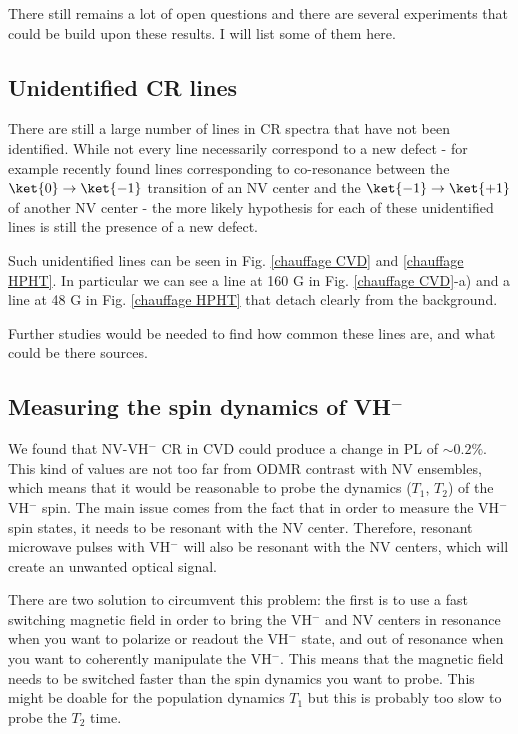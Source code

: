 \documentclass[a4paper,11pt]{report}
\begin{document}
\begin{refsection}
There still remains a lot of open questions and there are several experiments that could be build upon these results. I will list some of them here.

\subsection{Unidentified CR lines}

There are still a large number of lines in CR spectra that have not been identified. While not every line necessarily correspond to a new defect - for example \citep{wunderlich2021magnetic} recently found lines corresponding to co-resonance between the $\ket{0} \to \ket{-1}$ transition of an NV center and the $\ket{-1} \to \ket{+1}$ of another NV center - the more likely hypothesis for each of these unidentified lines is still the presence of a new defect.

Such unidentified lines can be seen in Fig. \ref{chauffage CVD} and \ref{chauffage HPHT}. In particular we can see a line at 160 G in Fig. \ref{chauffage CVD}-a) and a line at 48 G in Fig. \ref{chauffage HPHT} that detach clearly from the background. 

Further studies would be needed to find how common these lines are, and what could be there sources.

\subsection{Measuring the spin dynamics of VH$^-$}

We found that NV-VH$^-$ CR in CVD could produce a change in PL of $\sim 0.2 \%$. This kind of values are not too far from ODMR contrast with NV ensembles, which means that it would be reasonable to probe the dynamics ($T_1$, $T_2$) of the VH$^-$ spin. The main issue comes from the fact that in order to measure the VH$^-$ spin states, it needs to be resonant with the NV center. Therefore, resonant microwave pulses with VH$^-$ will also be resonant with the NV centers, which will create an unwanted optical signal.

There are two solution to circumvent this problem: the first is to use a fast switching magnetic field in order to bring the VH$^-$ and NV centers in resonance when you want to polarize or readout the VH$^-$ state, and out of resonance when you want to coherently manipulate the VH$^-$. This means that the magnetic field needs to be switched faster than the spin dynamics you want to probe. This might be doable for the population dynamics $T_1$ but this is probably too slow to probe the $T_2$ time.


\end{refsection}
\end{document}
